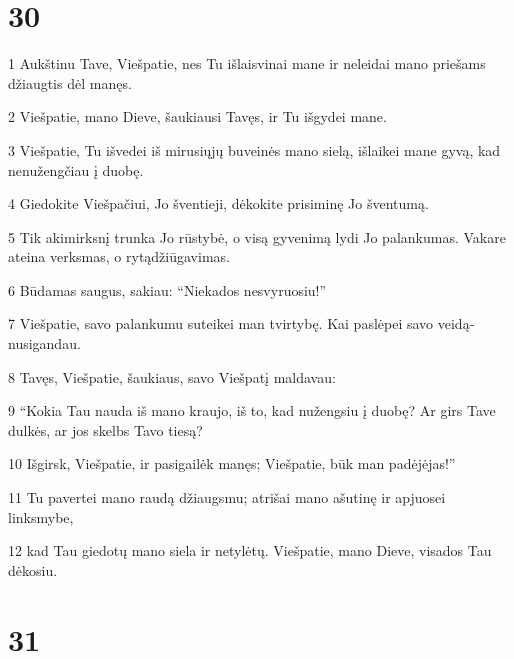 \chapter{30}


\par 1 Aukštinu Tave, Viešpatie, nes Tu išlaisvinai mane ir neleidai mano priešams džiaugtis dėl manęs. 
\par 2 Viešpatie, mano Dieve, šaukiausi Tavęs, ir Tu išgydei mane. 
\par 3 Viešpatie, Tu išvedei iš mirusiųjų buveinės mano sielą, išlaikei mane gyvą, kad nenužengčiau į duobę. 
\par 4 Giedokite Viešpačiui, Jo šventieji, dėkokite prisiminę Jo šventumą. 
\par 5 Tik akimirksnį trunka Jo rūstybė, o visą gyvenimą lydi Jo palankumas. Vakare ateina verksmas, o rytą­džiūgavimas. 
\par 6 Būdamas saugus, sakiau: “Niekados nesvyruosiu!” 
\par 7 Viešpatie, savo palankumu suteikei man tvirtybę. Kai paslėpei savo veidą­nusigandau. 
\par 8 Tavęs, Viešpatie, šaukiaus, savo Viešpatį maldavau: 
\par 9 “Kokia Tau nauda iš mano kraujo, iš to, kad nužengsiu į duobę? Ar girs Tave dulkės, ar jos skelbs Tavo tiesą? 
\par 10 Išgirsk, Viešpatie, ir pasigailėk manęs; Viešpatie, būk man padėjėjas!” 
\par 11 Tu pavertei mano raudą džiaugsmu; atrišai mano ašutinę ir apjuosei linksmybe, 
\par 12 kad Tau giedotų mano siela ir netylėtų. Viešpatie, mano Dieve, visados Tau dėkosiu.



\chapter{31}


